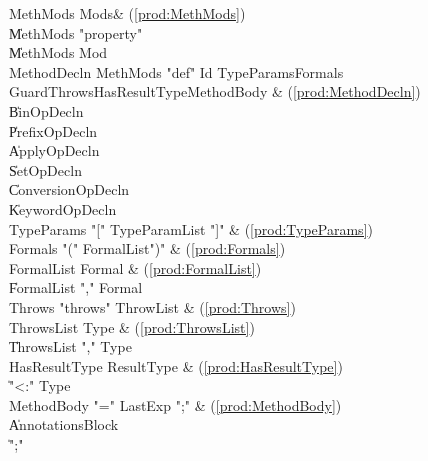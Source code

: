 \begin{bbgrammar}
            MethMods \: Mods\opt & (\ref{prod:MethMods}) \\
                     \| MethMods \xcd"property"  \\
                     \| MethMods Mod \\
         MethodDecln \: MethMods \xcd"def" Id TypeParams\opt Formals Guard\opt Throws\opt HasResultType\opt MethodBody & (\ref{prod:MethodDecln}) \\
                     \| BinOpDecln \\
                     \| PrefixOpDecln \\
                     \| ApplyOpDecln \\
                     \| SetOpDecln \\
                     \| ConversionOpDecln \\
                     \| KeywordOpDecln \\
          TypeParams \: \xcd"[" TypeParamList \xcd"]" & (\ref{prod:TypeParams}) \\
             Formals \: \xcd"(" FormalList\opt \xcd")" & (\ref{prod:Formals}) \\
          FormalList \: Formal & (\ref{prod:FormalList}) \\
                     \| FormalList \xcd"," Formal \\
             Throws \: \xcd"throws" ThrowList & (\ref{prod:Throws}) \\
          ThrowsList \: Type & (\ref{prod:ThrowsList}) \\
                     \| ThrowsList \xcd"," Type \\
       HasResultType \: ResultType & (\ref{prod:HasResultType}) \\
                     \| \xcd"<:" Type \\
          MethodBody \: \xcd"=" LastExp \xcd";" & (\ref{prod:MethodBody}) \\
                     \| Annotations\opt Block \\
                     \| \xcd";" \\

\end{bbgrammar}

